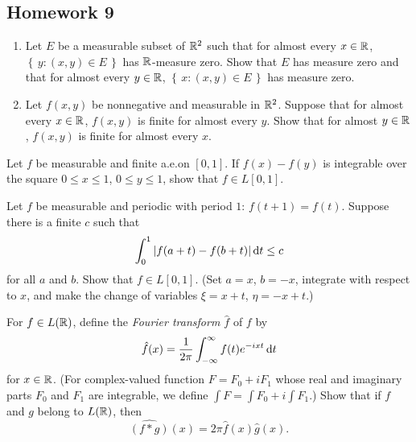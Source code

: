 \subsection{Homework 9}
\begin{problem}
  \hfill
  \begin{enumerate}[label=(\alph*),noitemsep]
  \item Let $E$ be a measurable subset of $\mathbb{R}^2$ such that for almost
    every $x\in\mathbb{R}$, $\left\{\,y:(x,y)\in E\,\right\}$ has $\mathbb{R}$-measure
    zero. Show that $E$ has measure zero and that for almost every
    $y\in\mathbb{R}$, $\left\{\,x:(x,y)\in E\,\right\}$ has measure zero.
  \item Let $f(x,y)$ be nonnegative and measurable in $\mathbb{R}^2$. Suppose
    that for almost every $x\in\mathbb{R}$, $f(x,y)$ is finite for almost every
    $y$. Show that for almost $y\in\mathbb{R}$, $f(x,y)$ is finite for almost
    every $x$.
  \end{enumerate}
\end{problem}
\begin{solution}
\end{solution}

\begin{problem}
  Let $f$ be measurable and finite a.e.\@ on $[0,1]$. If $f(x)-f(y)$ is
  integrable over the square $0\leq x\leq 1$, $0\leq y\leq 1$, show that
  $f\in L[0,1]$.
\end{problem}
\begin{solution}
\end{solution}

\begin{problem}
  Let $f$ be measurable and periodic with period $1$:
  $f(t+1)=f(t)$. Suppose there is a finite $c$ such that
  \[
    \int_0^1|f(a+t)-f(b+t)|\mathop{}\!\mathrm{d} t\leq c
  \]
  for all $a$ and $b$. Show that $f\in L[0,1]$. (Set $a=x$, $b=-x$,
  integrate with respect to $x$, and make the change of variables
  $\xi=x+t$, $\eta=-x+t$.)
\end{problem}
\begin{solution}
\end{solution}

\begin{problem}
  For $f\in L(\mathbb{R})$, define the \emph{Fourier transform $\hat f$} of $f$
  by
  \[
    \hat f(x)=\frac{1}{2\pi}\int_{-\infty}^\infty f(t)e^{-ixt}\mathop{}\!\mathrm{d} t
  \]
  for $x\in\mathbb{R}$. (For complex-valued function $F=F_0+iF_1$ whose real and
  imaginary parts $F_0$ and $F_1$ are integrable, we define
  $\int F=\int F_0+i\int F_1$.) Show that if $f$ and $g$ belong to
  $L(\mathbb{R})$, then
  \[
    \widehat{(f*g)}(x)=2\pi\hat f(x)\hat g(x).
  \]
\end{problem}
\begin{solution}
\end{solution}

